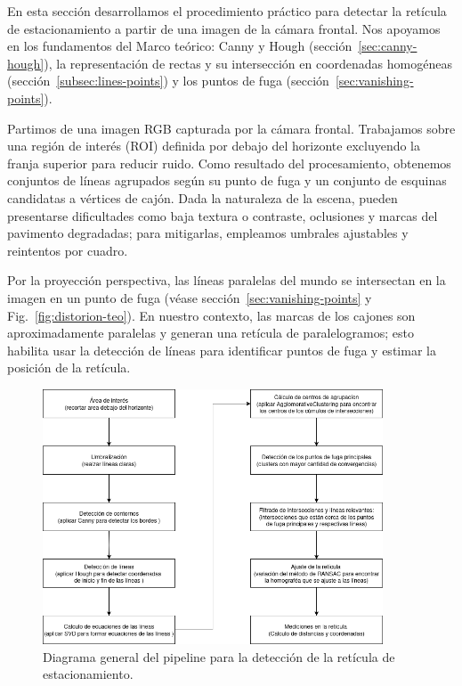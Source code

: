 
En esta sección desarrollamos el procedimiento práctico para detectar la
retícula de estacionamiento a partir de una imagen de la cámara frontal.
Nos apoyamos en los fundamentos del Marco teórico: Canny y Hough (sección~\ref{sec:canny-hough}),
la representación de rectas y su intersección en coordenadas homogéneas
(sección~\ref{subsec:lines-points}) y los puntos de fuga (sección~\ref{sec:vanishing-points}).

Partimos de una imagen RGB capturada por la cámara frontal. Trabajamos sobre una región de interés (ROI)
definida por debajo del horizonte excluyendo la franja superior para reducir ruido.
Como resultado del procesamiento, obtenemos conjuntos de líneas agrupados según su punto de fuga y un conjunto de esquinas candidatas a vértices de cajón. Dada la naturaleza de la escena, pueden presentarse dificultades como baja textura o contraste, oclusiones y marcas del pavimento degradadas; para mitigarlas, empleamos umbrales ajustables y reintentos por cuadro.


Por la proyección perspectiva, las líneas paralelas del mundo se intersectan en la imagen en un punto de fuga
(véase sección~\ref{sec:vanishing-points} y Fig.~\ref{fig:distorion-teo}).
En nuestro contexto, las marcas de los cajones son aproximadamente paralelas y generan
una retícula de paralelogramos; esto habilita usar la detección de líneas para identificar puntos de fuga
y estimar la posición de la retícula.


\begin{figure}[!ht]
    \centering
    \includegraphics[width=0.9\textwidth]{img/3-metodo/piperline-reticule1.png}
    \caption{Diagrama general del pipeline para la detección de la retícula de estacionamiento.}
    \label{fig:reticula-pipeline}
\end{figure}


